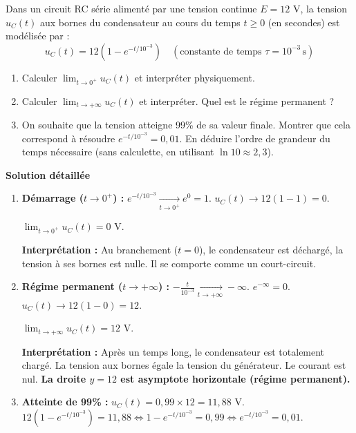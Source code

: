 \documentclass[11pt]{article}
\begin{document}
\begin{exoresolu}
    Dans un circuit RC série alimenté par une tension continue $E = 12$ V, la tension $u_C(t)$ aux bornes du condensateur au cours du temps $t \ge 0$ (en secondes) est modélisée par :
    \[ u_C(t) = 12 \left( 1 - e^{-t/10^{-3}} \right) \quad (\text{constante de temps } \tau = 10^{-3}\,\text{s}) \]
    \begin{enumerate}
        \item Calculer $\lim_{t\to 0^+} u_C(t)$ et interpréter physiquement.
        \item Calculer $\lim_{t\to +\infty} u_C(t)$ et interpréter. Quel est le régime permanent ?
        \item On souhaite que la tension atteigne 99\% de sa valeur finale. Montrer que cela correspond à résoudre $e^{-t/10^{-3}} = 0,01$. En déduire l'ordre de grandeur du temps nécessaire (sans calculette, en utilisant $\ln 10 \approx 2,3$).
    \end{enumerate}
    \tcblower
    \textbf{Solution détaillée}
    \begin{enumerate}
        \item \textbf{Démarrage ($t\to 0^+$) :}
              $e^{-t/10^{-3}} \xrightarrow[t\to 0^+]{} e^0 = 1$.
              $u_C(t) \to 12(1 - 1) = 0$.
              \begin{aretenir}
                  $\lim_{t\to 0^+} u_C(t) = 0$ V.
              \end{aretenir}
              \textbf{Interprétation :} Au branchement ($t=0$), le condensateur est déchargé, la tension à ses bornes est nulle. Il se comporte comme un court-circuit.
        \item \textbf{Régime permanent ($t\to +\infty$) :}
              $-\frac{t}{10^{-3}} \xrightarrow[t\to +\infty]{} -\infty$.
              $e^{-\infty} = 0$.
              $u_C(t) \to 12(1 - 0) = 12$.
              \begin{aretenir}
                  $\lim_{t\to +\infty} u_C(t) = 12$ V.
              \end{aretenir}
              \textbf{Interprétation :} Après un temps long, le condensateur est totalement chargé. La tension aux bornes égale la tension du générateur. Le courant est nul. \textbf{La droite $y=12$ est asymptote horizontale (régime permanent).}
        \item \textbf{Atteinte de 99\% :}
              $u_C(t) = 0,99 \times 12 = 11,88$ V.
              $12(1 - e^{-t/10^{-3}}) = 11,88 \iff 1 - e^{-t/10^{-3}} = 0,99 \iff e^{-t/10^{-3}} = 0,01$.

\end{enumerate}
\end{exoresolu}
\end{document}
